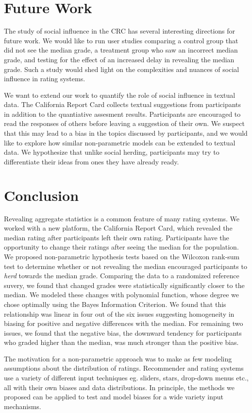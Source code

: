 \section{Future Work}
The study of social influence in the CRC has several interesting directions for future work.
We would like to run user studies comparing a control group that did not see the median grade, 
a treatment group who saw an incorrect median grade, and testing for the effect of an increased delay in revealing the median grade.
Such a study would shed light on the complexities and nuances of social influence in rating systems.
 
We want to extend our work to quantify the role of social influence in textual data. 
The California Report Card collects textual suggestions from participants in addition to the quantiative assesment results. 
Participants are encouraged to read the responses of others before leaving a suggestion of their own.
We suspect that this may lead to a bias in the topics discussed by participants, and we would like to explore how similar non-parametric models can be extended to textual data.
We hypothesize that unlike social herding, participants may try to differentiate their ideas from ones they have already ready.
\section{Conclusion}
Revealing aggregate statistics is a common feature of many rating systems.
We worked with a new platform, the California Report Card, which revealed the median rating after participants left their own rating.
Participants have the opportunity to change their ratings after seeing the median for the population.
We proposed non-parametric hypothesis tests based on the Wilcoxon rank-sum test to determine whether or not revealing the median encouraged participants to \emph{herd} towards the median grade.
Comparing the data to a randomized reference suvery, we found that changed grades were statistically significantly closer to the median.
We modeled these changes with polynomial function, whose degree we chose optimally using the Bayes Information Criterion. 
We found that this relationship was linear in four out of the six issues suggesting homogeneity in biasing for positive and negative differences with the median.
For remaining two issues, we found that the negative bias, the downward tendency for participants who graded higher than the median, was much stronger than the positive bias.

The motivation for a non-parametric approach was to make as few modeling assumptions about the distribution of ratings.
Recommender and rating systems use a variety of different input techniques eg. sliders, stars, drop-down menus etc., all with their own biases and data distributions.
In principle, the methods we proposed can be applied to test and model biases for a wide variety input mechanisms.

